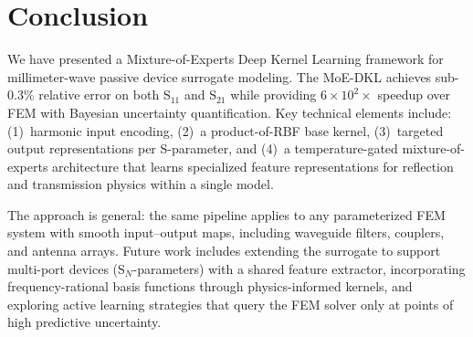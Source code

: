\documentclass[conference]{IEEEtran}
\begin{document}
\section{Conclusion}

We have presented a Mixture-of-Experts Deep Kernel Learning framework for millimeter-wave passive device surrogate modeling. The MoE-DKL achieves sub-0.3\% relative error on both S$_{11}$ and S$_{21}$ while providing $6\times 10^2\times$ speedup over FEM with Bayesian uncertainty quantification. Key technical elements include: (1)~harmonic input encoding, (2)~a product-of-RBF base kernel, (3)~targeted output representations per S-parameter, and (4)~a temperature-gated mixture-of-experts architecture that learns specialized feature representations for reflection and transmission physics within a single model.

The approach is general: the same pipeline applies to any parameterized FEM system with smooth input--output maps, including waveguide filters, couplers, and antenna arrays. Future work includes extending the surrogate to support multi-port devices (S$_N$-parameters) with a shared feature extractor, incorporating frequency-rational basis functions through physics-informed kernels, and exploring active learning strategies that query the FEM solver only at points of high predictive uncertainty.
\end{document}
